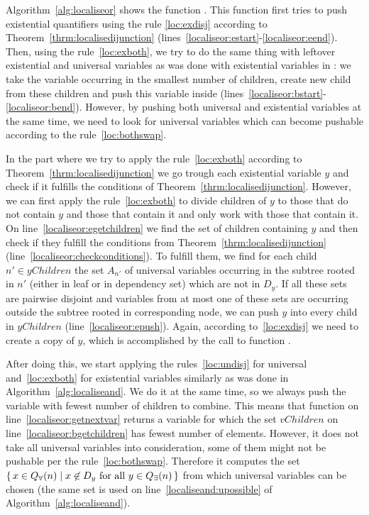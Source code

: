 \documentclass[
  digital, %
  color,
  twoside, %
  table,   %
  nolof,     %
  nolot,     %
]{fithesis3}
\let\setbuilder\set
\newcommand{\simpleset}[1]{\{{#1}\}}
\renewcommand{\set}[1]{\normalexpandarg\IfSubStr{#1}{|}{\setbuilder{#1}}{\simpleset{#1}}}
\theoremstyle{definition}
\theoremstyle{remark}
\newcommand{\eprefix}[1]{Q_{\exists}(#1)}
\newcommand{\uprefix}[1]{Q_{\forall}(#1)}
\begin{document}
Algorithm~\ref{alg:localiseor} shows the function . This function first tries to push existential quantifiers using the rule \eqref{loc:exdisj} according to Theorem~\ref{thrm:localisedijunction} (lines~\ref{localiseor:estart}-\ref{localiseor:eend}). Then, using the rule~\eqref{loc:exboth}, we try to do the same thing with leftover existential and universal variables as was done with existential variables in : we take the variable occurring in the smallest number of children, create new child from these children and push this variable inside (lines~\ref{localiseor:bstart}-\ref{localiseor:bend}). However, by pushing both universal and existential variables at the same time, we need to look for universal variables which can become pushable according to the rule~\eqref{loc:bothswap}.

In the part where we try to apply the rule~\eqref{loc:exboth} according to Theorem~\ref{thrm:localisedijunction} we go trough each existential variable $y$ and check if it fulfills the conditions of Theorem~\ref{thrm:localisedijunction}. However, we can first apply the rule~\eqref{loc:exboth} to divide children of $y$ to those that do not contain $y$ and those that contain it and only work with those that contain it. On line~\ref{localiseor:egetchildren} we find the set of children containing $y$ and then check if they fulfill the conditions from Theorem~\ref{thrm:localisedijunction} (line~\ref{localiseor:checkconditions}). To fulfill them, we find for each child $n' \in yChildren$ the set $A_{n'}$ of universal variables occurring in the subtree rooted in $n'$ (either in leaf or in dependency set) which are not in $D_y$. If all these sets are pairwise disjoint and variables from at most one of these sets are occurring outside the subtree rooted in corresponding node, we can push $y$ into every child in $yChildren$ (line~\ref{localiseor:epush}). Again, according to~\eqref{loc:exdisj} we need to create a copy of $y$, which is accomplished by the call to function .

After doing this, we start applying the rules~\eqref{loc:undisj} for universal and~\eqref{loc:exboth} for existential variables similarly as was done in Algorithm~\ref{alg:localiseand}. We do it at the same time, so we always push the variable with fewest number of children to combine. This means that function  on line~\ref{localiseor:getnextvar} returns a variable for which the set $vChildren$ on line~\ref{localiseor:bgetchildren} has fewest number of elements. However, it does not take all universal variables into consideration, some of them might not be pushable per the rule~\eqref{loc:bothswap}. Therefore it computes the set $\set{x \in \uprefix{n} | x \not\in D_y \text{ for all } y \in \eprefix{n}}$ from which universal variables can be chosen (the same set is used on line~\ref{localiseand:upossible} of Algorithm~\ref{alg:localiseand}).
\end{document}
